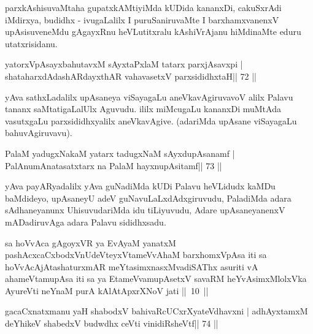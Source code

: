 \begin{artha}
parxkAshisuvaMtaha gupatxkAMtiyiMda kUDida kananxDi, cakuSxrAdi  iMdirxya, budidhx - ivugaLalilx I puruSaniruvaMte I barxhamxvanenxV upAsisuveneMdu gAgayxRnu heVLutitxralu kAshiVrAjanu hiMdinaMte eduru utatxrisidanu.
\end{artha}


\begin{shl}
yatorxVpAsayxbahutavxM sAyxtaPxlaM tatarx parxjAsavxpi |
shataharxdAdashARdayxthAR vahavasetxV parxsididhxtaH\hfill || 72 ||
\end{shl}

\begin{artha}
yAva sathxLadalilx upAsaneya viSayagaLu aneVkavAgiruvavoV alilx Palavu tananx saMtatigaLalUlx Aguvudu. ililx miMcugaLu kananxDi muMtAda vasutxgaLu parxsididhxyalilx aneVkavAgive. (adariMda upAsane viSayagaLu bahuvAgiruvavu).
\end{artha} 


\begin{shl}
PalaM yadugxNakaM yatarx tadugxNaM sAyxdupAsanamf |
PalAnumAnatasatxtarx na PalaM hayxnupAsitamf\hfill || 73 ||
\end{shl}

\begin{artha}
yAva payARyadalilx yAva guNadiMda kUDi Palavu heVLidudx kaMDu  baMdideyo, upAsaneyU adeV guNavuLaLxdAdxgiruvudu, PaladiMda adara  sAdhaneyanunx UhisuvudariMda idu tiLiyuvudu, Adare upAsaneyanenxV mADadiruvAga adara Palavu sididhxsadu.
\end{artha}


\begin{kandikeshl}
sa hoVvAca gAgoyxVR ya EvAyaM yanatxM pashAcxcaCxbodxV\s nUdeVteyxV\-tameVvAhaM barxhomxVpAsa iti sa hoVvAcAjAtashaturxmAR meYtasimxnasxM\-vadiSAThx asuriti vA ahameVtamupAsa iti sa ya EtameVvamupAsetxV savaRM heYvAsimxMlolxVka AyureVti neYnaM purA kAlAtApxrXNoV jati ||~10~||
\end{kandikeshl}


\begin{shl}
gacaCxnatxmanu yaH shabodxV bahivaRcUCxrXyateV\s dhavxni |
adhAyxtamxM deYhikeV shabedxV budwdhx ceVti vinidiRsheVtf\hfill || 74 ||
\end{shl}

